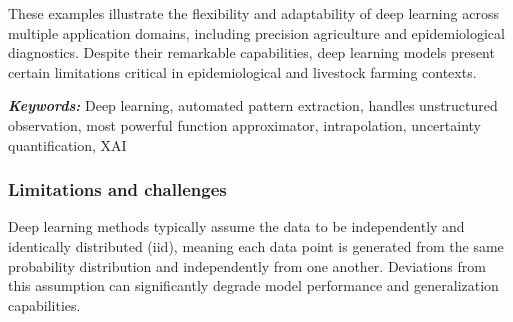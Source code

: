 These examples illustrate the flexibility and adaptability of deep learning across multiple application domains, including precision agriculture and epidemiological diagnostics. Despite their remarkable capabilities, deep learning models present certain limitations critical in epidemiological and livestock farming contexts. 

\textit{\textbf{Keywords:}} Deep learning, automated pattern extraction, handles unstructured observation, most powerful function approximator, intrapolation, uncertainty quantification, XAI


\subsubsection{Limitations and challenges}


Deep learning methods typically assume the data to be independently and identically distributed (iid), meaning each data point is generated from the same probability distribution and independently from one another. Deviations from this assumption can significantly degrade model performance and generalization capabilities.

